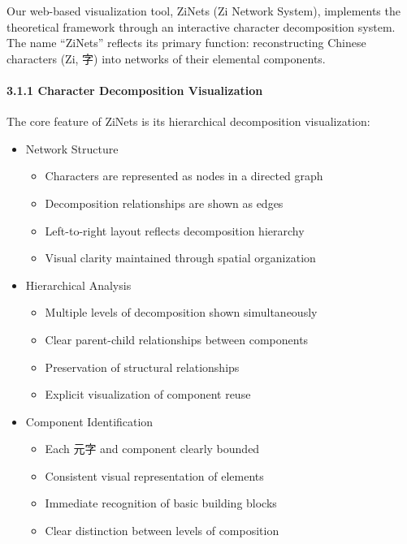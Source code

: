 \documentclass[
]{article}
\providecommand{\tightlist}{%
  \setlength{\itemsep}{0pt}\setlength{\parskip}{0pt}}
\begin{document}
Our web-based visualization tool, ZiNets (Zi Network System), implements
the theoretical framework through an interactive character decomposition
system. The name ``ZiNets'' reflects its primary function:
reconstructing Chinese characters (Zi, 字) into networks of their
elemental components.

\paragraph{3.1.1 Character Decomposition
Visualization}\label{character-decomposition-visualization}

The core feature of ZiNets is its hierarchical decomposition
visualization:

\begin{itemize}
\tightlist
\item
  Network Structure

  \begin{itemize}
  \tightlist
  \item
    Characters are represented as nodes in a directed graph
  \item
    Decomposition relationships are shown as edges
  \item
    Left-to-right layout reflects decomposition hierarchy
  \item
    Visual clarity maintained through spatial organization
  \end{itemize}
\item
  Hierarchical Analysis

  \begin{itemize}
  \tightlist
  \item
    Multiple levels of decomposition shown simultaneously
  \item
    Clear parent-child relationships between components
  \item
    Preservation of structural relationships
  \item
    Explicit visualization of component reuse
  \end{itemize}
\item
  Component Identification

  \begin{itemize}
  \tightlist
  \item
    Each 元字 and component clearly bounded
  \item
    Consistent visual representation of elements
  \item
    Immediate recognition of basic building blocks
  \item
    Clear distinction between levels of composition
  \end{itemize}
\end{itemize}
\end{document}

